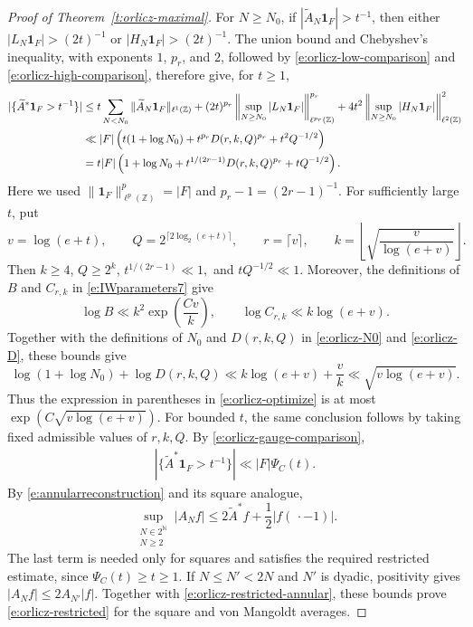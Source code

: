 \documentclass[12pt,reqno]{amsart}
\numberwithin{equation}{section}
\theoremstyle{definition}
\theoremstyle{remark}
\begin{document}
\begin{proof}[Proof of Theorem~\ref{t:orlicz-maximal}]
For \(N\geq N_0\), if
\(|\widetilde A_N\mathbf1_F|>t^{-1}\), then either
\(|L_N\mathbf1_F|>(2t)^{-1}\) or
\(|H_N\mathbf1_F|>(2t)^{-1}\).
The union bound and Chebyshev's inequality, with exponents
\(1\), \(p_r\), and \(2\), followed by
\eqref{e:orlicz-low-comparison} and
\eqref{e:orlicz-high-comparison}, therefore give, for \(t\geq1\),
\begin{align}
 |\{\widetilde A^*\mathbf1_F>t^{-1}\}|
 &\leq
 t\sum_{N<N_0}
 \|\widetilde A_N\mathbf1_F\|_{\ell^1(\mathbb Z)}
 +
 (2t)^{p_r}
 \left\|\sup_{N\geq N_0}|L_N\mathbf1_F|
 \right\|_{\ell^{p_r}(\mathbb Z)}^{p_r}
+
 4t^2
 \left\|\sup_{N\geq N_0}|H_N\mathbf1_F|
 \right\|_{\ell^2(\mathbb Z)}^2
 \notag\\
 &\ll
 |F|\left(
 t(1+\log N_0)+t^{p_r}D(r,k,Q)^{p_r}+t^2Q^{-1/2}
 \right)
 \notag\\
 &=t|F|\left(
 1+\log N_0+
 t^{1/(2r-1)}D(r,k,Q)^{p_r}
 +tQ^{-1/2}
 \right).
 \label{e:orlicz-optimize}
\end{align}
Here we used
\(\|\mathbf1_F\|_{\ell^p(\mathbb Z)}^p=|F|\)
and \(p_r-1=(2r-1)^{-1}\).
For sufficiently large \(t\), put
\[
 v=\log(e+t),\qquad
 Q=2^{\lceil2\log_2(e+t)\rceil},\qquad
 r=\lceil v\rceil,\qquad
 k=\left\lfloor
 \sqrt{\frac{v}{\log(e+v)}}
 \right\rfloor.
\]
Then \(k\geq4\), \(Q\geq2^k\), $t^{1/(2r-1)}\ll1,$ and $tQ^{-1/2}\ll1.$
Moreover, the definitions of \(B\) and \(C_{r,k}\) in
\eqref{e:IWparameters7} give
\[
 \log B\ll k^2\exp\left(\frac{Cv}{k}\right),
 \qquad
 \log C_{r,k}\ll k\log(e+v).
\]
Together with the definitions of \(N_0\) and \(D(r,k,Q)\) in
\eqref{e:orlicz-N0} and \eqref{e:orlicz-D}, these bounds give
\[
 \log(1+\log N_0)+\log D(r,k,Q)
 \ll
 k\log(e+v)+\frac{v}{k}
 \ll\sqrt{v\log(e+v)}.
\]
Thus the expression in parentheses in
\eqref{e:orlicz-optimize} is at most $\exp\left(C\sqrt{v\log(e+v)}\right).$
For bounded \(t\), the same conclusion follows by taking fixed
admissible values of \(r,k,Q\).  By \eqref{e:orlicz-gauge-comparison},
\begin{align}\label{e:orlicz-restricted-annular}
 |\{\widetilde A^*\mathbf1_F>t^{-1}\}|
 \ll |F|\Psi_C(t).
\end{align}
By \eqref{e:annularreconstruction} and its square analogue,
\[
 \sup_{\substack{N\in2^{\mathbb N}\\N\geq2}}|A_Nf|
 \leq
 2\widetilde A^*f+\frac12|f(\,\cdot-1)|.
\]
The last term is needed only for squares and satisfies the
required restricted estimate, since \(\Psi_C(t)\geq t\geq1\).
If \(N\leq N'<2N\) and \(N'\) is dyadic, positivity gives
\(|A_Nf|\leq2A_{N'}|f|\).
Together with \eqref{e:orlicz-restricted-annular}, these bounds
prove \eqref{e:orlicz-restricted} for the square and
von Mangoldt averages.



\end{proof}
\end{document}
